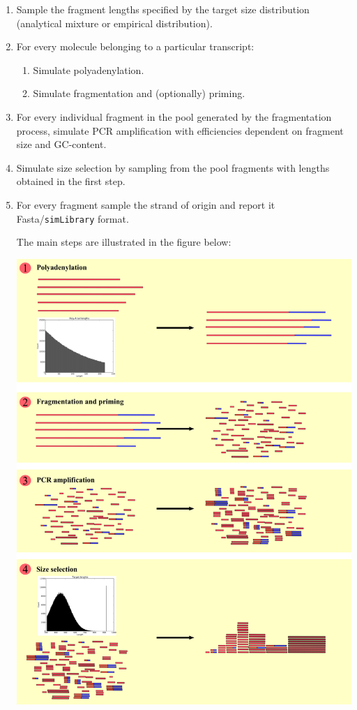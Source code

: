 \begin{enumerate}
\item{Sample the fragment lengths specified by the target size distribution (analytical mixture or empirical distribution).}
\item{For every molecule belonging to a particular transcript:
    \begin{enumerate}[label=\emph{\alph*})]
        \item Simulate polyadenylation.
        \item Simulate fragmentation and (optionally) priming.
    \end{enumerate}
}
\item{For every individual fragment in the pool generated by the fragmentation process, simulate PCR amplification with efficiencies dependent on fragment size and GC-content.}
\item{Simulate size selection by sampling from the pool fragments with lengths obtained in the first step.}
\item{For every fragment sample the strand of origin and report it Fasta/{\tt simLibrary} \cite{simngs} format.}

The main steps are illustrated in the figure below:

\begin{center}
\includegraphics[scale=0.36]{pix/rlsim_main.png}
\end{center}


\end{enumerate}
